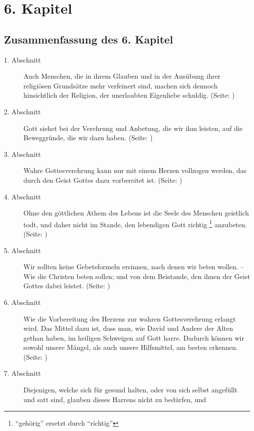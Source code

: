 

\chapter{6. Kapitel}  \label{kap6}

\section{Zusammenfassung des 6. Kapitel}
\footnotesize
\begin{description}
\item[1. Abschnitt] Auch Menschen, die in ihrem Glauben und in der Ausübung
ihrer religiösen Grundsätze mehr verfeinert sind, machen sich dennoch
hinsichtlich der Religion, der unerlaubten Eigenliebe schuldig. (Seite:
\pageref{kap6_ab1})
\item[2. Abschnitt] Gott siehet bei der Verehrung und Anbetung, die wir ihm
leisten, auf die Beweggründe, die wir dazu haben. (Seite: \pageref{kap6_ab2})
\item[3. Abschnitt] Wahre Gottesverehrung kann nur mit einem Herzen vollzogen
werden, das durch den Geist Gottes dazu vorbereitet ist. (Seite:
\pageref{kap6_ab3})
\item[4. Abschnitt] Ohne den göttlichen Athem des Lebens ist die Seele des
Menschen geistlich todt, und daher nicht im Stande, den lebendigen Gott richtig
\footnote{"`gehörig"' ersetzt durch "`richtig"'}
anzubeten. (Seite: \pageref{kap6_ab4})
\item[5. Abschnitt] Wir sollten keine Gebetsformeln ersinnen, nach denen wir
beten wollen. -- Wie die Christen beten sollen; und von dem Beistande, den ihnen
der Geist Gottes dabei leistet. (Seite: \pageref{kap6_ab5})
\item[6. Abschnitt] Wie die Vorbereitung des Herzens zur wahren Gottesverehrung
erlangt wird. Das Mittel dazu ist, dass man, wie David und Andere der Alten
gethan haben, im heiligen Schweigen auf Gott harre. Dadurch können wir sowohl
unsere Mängel, als auch unsere Hilfsmittel, am besten erkennen. (Seite:
\pageref{kap6_ab6})
\item[7. Abschnitt] Diejenigen, welche sich für gesund halten, oder von sich
selbst angefüllt und satt sind, glauben dieses Harrens nicht zu bedürfen, und

\end{description}

